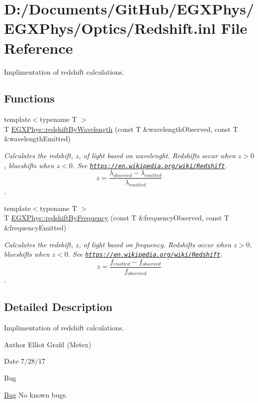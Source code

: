 \hypertarget{_redshift_8inl}{}\section{D\+:/\+Documents/\+Git\+Hub/\+E\+G\+X\+Phys/\+E\+G\+X\+Phys/\+Optics/\+Redshift.inl File Reference}
\label{_redshift_8inl}


Implimentation of redshift calculations.  


\subsection*{Functions}
\begin{DoxyCompactItemize}
\item 
{\footnotesize template$<$typename T $>$ }\\T \hyperlink{group___optics_ga29300a13e34da35332ca2d447b5ce82d}{E\+G\+X\+Phys\+::redshift\+By\+Wavelength} (const T \&wavelength\+Observed, const T \&wavelength\+Emitted)
\begin{DoxyCompactList}\small\item\em Calculates the redshift, $z$, of light based on wavelenght. Redshifts occur when $z > 0$, blueshifts when $z < 0$. See \href{https://en.wikipedia.org/wiki/Redshift}{\tt https\+://en.\+wikipedia.\+org/wiki/\+Redshift}. \[z=\frac{\lambda_{observed}-\lambda_{emitted}}{\lambda_{emitted}}\]. \end{DoxyCompactList}\item 
{\footnotesize template$<$typename T $>$ }\\T \hyperlink{group___optics_gacc6d3b2922061214d64b89a4b8e3967a}{E\+G\+X\+Phys\+::redshift\+By\+Frequency} (const T \&frequency\+Observed, const T \&frequency\+Emitted)
\begin{DoxyCompactList}\small\item\em Calculates the redshift, $z$, of light based on frequency. Redshifts occur when $z > 0$, blueshifts when $z < 0$. See \href{https://en.wikipedia.org/wiki/Redshift}{\tt https\+://en.\+wikipedia.\+org/wiki/\+Redshift}. \[z=\frac{f_{emitted}-f_{observed}}{f_{observed}}\]. \end{DoxyCompactList}\end{DoxyCompactItemize}


\subsection{Detailed Description}
Implimentation of redshift calculations. 

\begin{DoxyAuthor}{Author}
Elliot Grafil (Metex) 
\end{DoxyAuthor}
\begin{DoxyDate}{Date}
7/28/17 
\end{DoxyDate}
\begin{DoxyRefDesc}{Bug}
\item[\hyperlink{bug__bug000030}{Bug}]No known bugs. \end{DoxyRefDesc}
